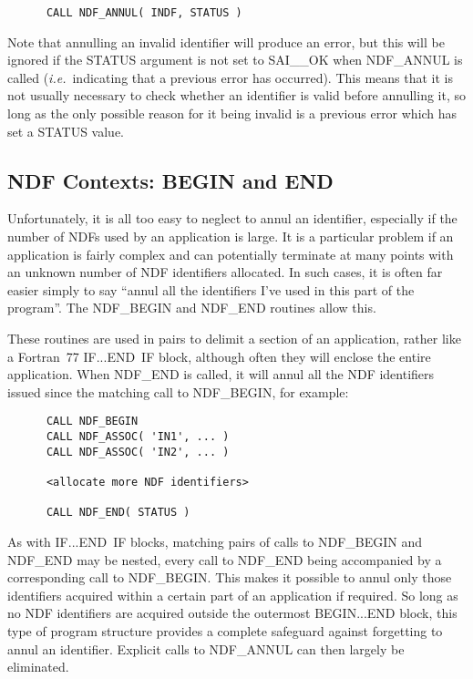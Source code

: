 \documentclass[twoside,11pt]{article}
\newcommand{\htmlref}[2]{#1}
\newcommand{\xlabel}[1]{}
\newcommand{\st}[1]{{\em{#1}}}
\begin{document}
\small
\begin{verbatim}
      CALL NDF_ANNUL( INDF, STATUS )
\end{verbatim}
\normalsize

Note that annulling an invalid identifier will produce an error, but this will
be ignored if the STATUS argument is not set to SAI\_\_OK when NDF\_ANNUL is
called (\st{i.e.}\ indicating that a previous error has occurred).
This means that it is not usually necessary to check whether an identifier
is valid before annulling it, so long as the only possible reason for it being
invalid is a previous error which has set a STATUS value. 

\subsection{\xlabel{ndf_contexts_begin_and_end}\label{ss:beginend}NDF Contexts: BEGIN and END}

Unfortunately, it is all too easy to neglect to annul an identifier,  especially
if the number of NDFs used by an application is large.
It is a particular problem if an application is fairly complex and can
potentially terminate at many points with an unknown number of NDF identifiers
allocated.
In such cases, it is often far easier simply to say ``annul all the
identifiers I've used in this part of the program''. 
The \htmlref{NDF\_BEGIN}{NDF_BEGIN} and \htmlref{NDF\_END}{NDF_END} routines allow this.

These routines are used in pairs to delimit a section of an application, rather
like a Fortran~77 IF...END~IF block, although often they will enclose the
entire application. 
When NDF\_END is called, it will annul all the NDF identifiers issued since
the matching call to NDF\_BEGIN, for example: 

\small
\begin{verbatim}
      CALL NDF_BEGIN
      CALL NDF_ASSOC( 'IN1', ... )
      CALL NDF_ASSOC( 'IN2', ... )

      <allocate more NDF identifiers>

      CALL NDF_END( STATUS )
\end{verbatim}
\normalsize

As with IF...END~IF blocks, matching pairs of calls to NDF\_BEGIN and NDF\_END
may be nested, every call to NDF\_END being accompanied by a corresponding call
to NDF\_BEGIN. 
This makes it possible to annul only those identifiers acquired within a 
certain part of an application if required.
So long as no NDF identifiers are acquired outside the outermost BEGIN...END
block, this type of program structure provides a complete safeguard against
forgetting to annul an identifier. 
Explicit calls to \htmlref{NDF\_ANNUL}{NDF_ANNUL} can then largely be eliminated.
\end{document}
